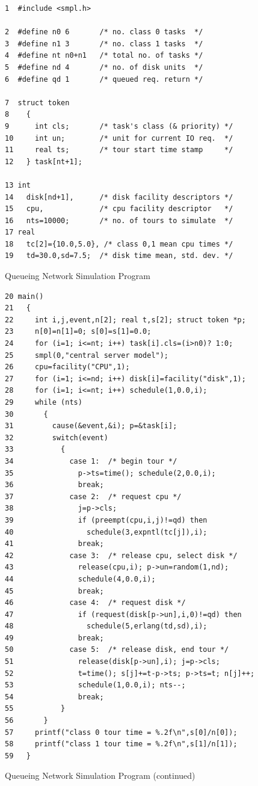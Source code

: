 \begin{figure}[H]
\centering
\begin{minipage}{\textwidth}
\begin{verbatim}
1  #include <smpl.h>

2  #define n0 6       /* no. class 0 tasks  */
3  #define n1 3       /* no. class 1 tasks  */
4  #define nt n0+n1   /* total no. of tasks */
5  #define nd 4       /* no. of disk units  */
6  #define qd 1       /* queued req. return */

7  struct token
8    {
9      int cls;       /* task's class (& priority) */
10     int un;        /* unit for current IO req.  */
11     real ts;       /* tour start time stamp     */
12   } task[nt+1];

13 int
14   disk[nd+1],      /* disk facility descriptors */
15   cpu,             /* cpu facility descriptor   */
16   nts=10000;       /* no. of tours to simulate  */
17 real
18   tc[2]={10.0,5.0}, /* class 0,1 mean cpu times */
19   td=30.0,sd=7.5;  /* disk time mean, std. dev. */
\end{verbatim}
\end{minipage}
\caption{Queueing Network Simulation Program}
\end{figure}


\addtocounter{figure}{-1}
\begin{figure}[H]
\centering
\begingroup\fontsize{8}{9.5}\selectfont
\begin{verbatim}
20 main()
21   {
22     int i,j,event,n[2]; real t,s[2]; struct token *p;
23     n[0]=n[1]=0; s[0]=s[1]=0.0;
24     for (i=1; i<=nt; i++) task[i].cls=(i>n0)? 1:0;
25     smpl(0,"central server model");
26     cpu=facility("CPU",1);
27     for (i=1; i<=nd; i++) disk[i]=facility("disk",1);
28     for (i=1; i<=nt; i++) schedule(1,0.0,i);
29     while (nts)
30       {
31         cause(&event,&i); p=&task[i];
32         switch(event)
33           {
34             case 1:  /* begin tour */
35               p->ts=time(); schedule(2,0.0,i);
36               break;
37             case 2:  /* request cpu */
38               j=p->cls;
39               if (preempt(cpu,i,j)!=qd) then
40                 schedule(3,expntl(tc[j]),i);
41               break;
42             case 3:  /* release cpu, select disk */
43               release(cpu,i); p->un=random(1,nd);
44               schedule(4,0.0,i);
45               break;
46             case 4:  /* request disk */
47               if (request(disk[p->un],i,0)!=qd) then
48                 schedule(5,erlang(td,sd),i);
49               break;
50             case 5:  /* release disk, end tour */
51               release(disk[p->un],i); j=p->cls;
52               t=time(); s[j]+=t-p->ts; p->ts=t; n[j]++;
53               schedule(1,0.0,i); nts--;
54               break;
55           }
56       }
57     printf("class 0 tour time = %.2f\n",s[0]/n[0]);
58     printf("class 1 tour time = %.2f\n",s[1]/n[1]);
59   }
\end{verbatim}
\endgroup
\caption{Queueing Network Simulation Program (continued)}
\end{figure}

